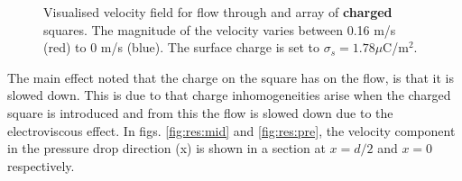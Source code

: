 \begin{figure}
  \centering
  \hspace{5pt} 
  \caption[Velocity field for flow through and array of
    charged squares.]{Visualised velocity field for flow
    through and array of \textbf{charged} squares. The magnitude of
    the velocity varies between 0.16 m/s (red) to 0 m/s (blue). The
    surface charge is set to $\sigma_s = 1.78 \mu$C/m$^2$.}
  \label{fig:res:s_charged}
\end{figure}

The main effect noted that the charge on the square has on the flow,
is that it is slowed down. This is due to that charge inhomogeneities
arise when the charged square is introduced and from this the flow is
slowed down due to the electroviscous effect. In
figs. \ref{fig:res:mid} and \ref{fig:res:pre}, the velocity component
in the pressure drop direction (x) is shown in a section at $x = d/2$
and $x = 0$ respectively.  

